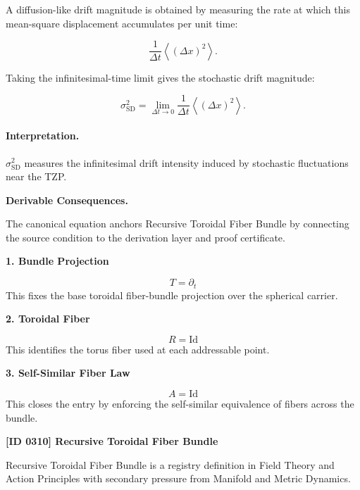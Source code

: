 A diffusion-like drift magnitude is obtained by measuring the rate at which this mean-square displacement accumulates per unit time:

\begin{equation}
\frac{1}{\Delta t}
\left\langle(\Delta x)^2\right\rangle .
\end{equation}

Taking the infinitesimal-time limit gives the stochastic drift magnitude:

\begin{equation}
\boxed{
\sigma_{\mathrm{SD}}^{2}
=
\lim_{\Delta t\to 0}
\frac{1}{\Delta t}
\left\langle
(\Delta x)^2
\right\rangle .
}
\end{equation}

\paragraph{Interpretation.}
$\sigma_{\mathrm{SD}}^{2}$ measures the infinitesimal drift intensity induced by stochastic fluctuations near the TZP.

\par\vspace{0.35em}
\noindent\textbf{Derivable Consequences.}\quad
\begingroup
\footnotesize
\raggedright
The canonical equation anchors Recursive Toroidal Fiber Bundle by connecting the source condition to the derivation layer and proof certificate.
\par\endgroup

\noindent\textbf{1. Bundle Projection}\par
\[
T=\partial_t
\]
\noindent This fixes the base toroidal fiber-bundle projection over the spherical carrier.\par
\noindent\textbf{2. Toroidal Fiber}\par
\[
R=\mathrm{Id}
\]
\noindent This identifies the torus fiber used at each addressable point.\par
\noindent\textbf{3. Self-Similar Fiber Law}\par
\[
A=\mathrm{Id}
\]
\noindent This closes the entry by enforcing the self-similar equivalence of fibers across the bundle.\par

\clearpage
\noindent\textbf{[ID 0310] Recursive Toroidal Fiber Bundle}\par
\vspace{0.35em}
\begingroup\small
{}
Recursive Toroidal Fiber Bundle is a registry definition in Field Theory and Action Principles with secondary pressure from Manifold and Metric Dynamics.

